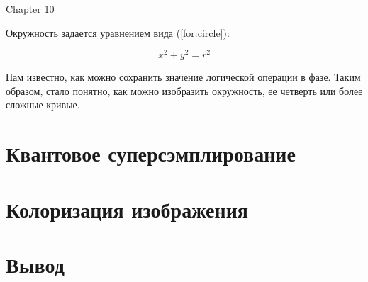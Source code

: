 Chapter 10 

Окружность задается уравнением вида (\ref{for:circle}):

\begin{equation}
\label{for:circle}
x^2 + y^2 = r^2
\end{equation}

Нам известно, как можно сохранить значение логической операции в фазе. Таким образом, стало понятно, как можно изобразить окружность, ее четверть или более сложные кривые.

\section{Квантовое суперсэмплирование}
\section{Колоризация изображения}

\section*{Вывод}

